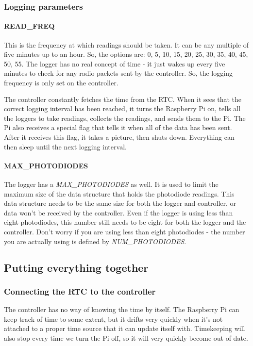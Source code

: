 \documentclass[10pt]{article}
\begin{document}
\subsubsection{Logging parameters}

\paragraph{READ\_FREQ}
This is the frequency at which readings should be taken. It can be any multiple of five minutes up to an hour. So, the options are: 0, 5, 10, 15, 20, 25, 30, 35, 40, 45, 50, 55. The logger has no real concept of time - it just wakes up every five minutes to check for any radio packets sent by the controller. So, the logging frequency is only set on the controller.

The controller constantly fetches the time from the RTC. When it sees that the correct logging interval has been reached, it turns the Raspberry Pi on, tells all the loggers to take readings, collects the readings, and sends them to the Pi. The Pi also receives a special flag that tells it when all of the data has been sent. After it receives this flag, it takes a picture, then shuts down. Everything can then sleep until the next logging interval.

\paragraph{MAX\_PHOTODIODES}
The logger has a \textit{MAX\_PHOTODIODES} as well. It is used to limit the maximum size of the data structure that holds the photodiode readings. This data structure needs to be the same size for both the logger and controller, or data won't be received by the controller. Even if the logger is using less than eight photodiodes, this number still needs to be eight for both the logger and the controller. Don't worry if you are using less than eight photodiodes - the number you are actually using is defined by \textit{NUM\_PHOTODIODES}.

\subsection{Putting everything together}

\subsubsection{Connecting the RTC to the controller}
The controller has no way of knowing the time by itself. The Raspberry Pi can keep track of time to some extent, but it drifts very quickly when it's not attached to a proper time source that it can update itself with. Timekeeping will also stop every time we turn the Pi off, so it will very quickly become out of date.
\end{document}
